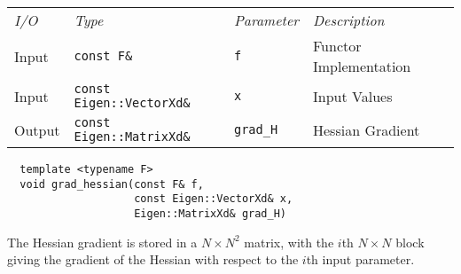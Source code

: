 \begin{tcolorbox}[colback=white,colframe=gray90, coltitle=black,boxrule=3pt,
fonttitle=\bfseries,title=Hessian Gradient]

\begin{tabular}{llll}
\textit{I/O} & \textit{Type} & \textit{Parameter} & \textit{Description} \\
Input & \texttt{const F\&} & \texttt{f} & Functor Implementation \\
Input & \texttt{const Eigen::VectorXd\&} & \texttt{x} & Input Values \\
Output & \texttt{const Eigen::MatrixXd\&} & \texttt{grad\_H} & Hessian Gradient \\
\end{tabular}

\vspace{5mm}

\begin{verbatim}
  template <typename F>
  void grad_hessian(const F& f,
                    const Eigen::VectorXd& x,
                    Eigen::MatrixXd& grad_H)
\end{verbatim}

\vspace{5mm}

The Hessian gradient is stored in a $N \times N^{2}$ matrix, with the $i$th
$N \times N$ block giving the gradient of the Hessian with respect to the
$i$th input parameter.

\end{tcolorbox}

